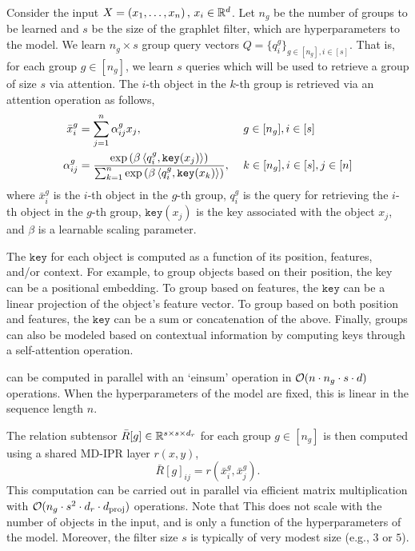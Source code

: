 Consider the input $X = \left(x_1, \ldots, x_n\right),\, x_i \in \mathbb{R}^d$. Let $n_g$ be the number of groups to be learned and $s$ be the size of the graphlet filter, which are hyperparameters to the model. We learn $n_g \times s$ group query vectors $Q = \{q_{i}^{g}\}_{g \in [n_g], i \in [s]}$. That is, for each group $g \in [n_g]$, we learn $s$ queries which will be used to retrieve a group of size $s$ via attention. The $i$-th object in the $k$-th group is retrieved via an attention operation as follows,
\begin{equation}\label{eq:group_attn}
    \begin{aligned}
        \bar{x}_{i}^{g} &= \sum_{j = 1}^{n} \alpha_{ij}^{g} x_j, \ &&g \in [n_g],  i \in [s]\\
        \alpha_{ij}^{g} &= \frac{\exp\paren{\beta \iprod{q_i^g}{\mathtt{key}(x_j)}}}{\sum_{k = 1}^{n}{\exp\paren{\beta \iprod{q_i^g}{\mathtt{key}(x_k)}}}}, \ &&k \in [n_g], i \in [s], j \in [n]
    \end{aligned}
\end{equation}
where $\bar{x}_{i}^{g}$ is the $i$-th object in the $g$-th group, $q_{i}^{g}$ is the query for retrieving the $i$-th object in the $g$-th group, $\mathtt{key}(x_j)$ is the key associated with the object $x_j$, and $\beta$ is a learnable scaling parameter.

The $\mathtt{key}$ for each object is computed as a function of its position, features, and/or context. For example, to group objects based on their position, the key can be a positional embedding. To group based on features, the $\mathtt{key}$ can be a linear projection of the object's feature vector. To group based on both position and features, the $\mathtt{key}$ can be a sum or concatenation of the above. Finally, groups can also be modeled based on contextual information by computing keys through a self-attention operation.

 can be computed in parallel with an `einsum' operation in ${\mathcal{O}}(n \cdot n_g \cdot s \cdot d)$ operations. When the hyperparameters of the model are fixed, this is linear in the sequence length $n$.

The relation subtensor $\bar{R}[g] \in \mathbb{R}^{s \times s \times d_r}$ for each group $g \in [n_g]$ is then computed using a shared MD-IPR layer $r(x, y)$,
\begin{equation}
    \bar{R}[g]_{ij} = r(\bar{x}_{i}^{g}, \bar{x}_{j}^{g}).
\end{equation}
This computation can be carried out in parallel via efficient matrix multiplication with ${\mathcal{O}}(n_g \cdot s^2 \cdot d_r \cdot d_{\mathrm{proj}})$ operations. Note that This does not scale with the number of objects in the input, and is only a function of the hyperparameters of the model. Moreover, the filter size $s$ is typically of very modest size (e.g., $3$ or $5$).

